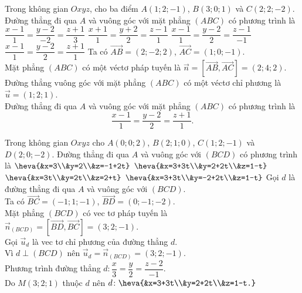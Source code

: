 \begin{ex}%
	Trong không gian $Oxyz$, cho ba điểm $A(1;2;-1)$, $B(3;0;1)$ và $C(2;2;-2)$. Đường thẳng đi qua $A$ và vuông góc với mặt phẳng $(ABC)$ có phương trình là
	\choice
	{$\dfrac{x-1}{1}=\dfrac{y-2}{-2}=\dfrac{z+1}{3}$}
	{$\dfrac{x+1}{1}=\dfrac{y+2}{2}=\dfrac{z-1}{1}$}
	{$\dfrac{x-1}{1}=\dfrac{y-2}{2}=\dfrac{z-1}{-1}$}
	{\True $\dfrac{x-1}{1}=\dfrac{y-2}{2}=\dfrac{z+1}{1}$}
	\loigiai
	{Ta có $\overrightarrow{AB}=(2;-2;2)$, $\overrightarrow{AC}=(1;0;-1)$.\\
		Mặt phẳng $(ABC)$ có một véctơ pháp tuyến là $\vec{n}=\left[\overrightarrow{AB},\overrightarrow{AC}\right]=(2;4;2)$.\\
		Đường thẳng vuông góc với mặt phẳng $(ABC)$ có một véctơ chỉ phương là $\vec{u}=(1;2;1)$.\\
		Đường thẳng đi qua $A$ và vuông góc với mặt phẳng $(ABC)$ có phương trình là
		\[\dfrac{x-1}{1}=\dfrac{y-2}{2}=\dfrac{z+1}{1}.\]
	}
\end{ex}
\begin{ex}%
	Trong không gian $Oxyz$ cho $A(0;0;2)$, $B(2;1;0)$, $C(1;2;-1)$ và $D(2;0;-2)$. Đường thẳng đi qua $A$ và vuông góc với $(BCD)$ có phương trình là
	\choice
	{$\heva{&x=3\\&y=2\\&z=-1+2t}$}
	{\True $\heva{&x=3+3t\\&y=2+2t\\&z=1-t}$}
	{$\heva{&x=3t\\&y=2t\\&z=2+t}$}
	{$\heva{&x=3+3t\\&y=-2+2t\\&z=1-t}$}
	\loigiai
	{
		Gọi $d$ là đường thẳng đi qua $A$ và vuông góc với $(BCD)$.\\
		Ta có $\overrightarrow{BC}=(-1;1;-1)$, $\overrightarrow{BD}=(0;-1;-2)$.\\
		Mặt phẳng $(BCD)$ có vec tơ pháp tuyến là $\vec{n}_{(BCD)}=\left[\overrightarrow{BD},\overrightarrow{BC}\right]=(3;2;-1)$.\\
		Gọi $\vec{u}_{d}$ là vec tơ chỉ phương của đường thẳng $d$.\\
		Vì $d\perp(BCD)$ nên $\overrightarrow{u}_{d}=\vec{n}_{(BCD)}=(3;2;-1)$.\\
		Phương trình đường thẳng $d\colon\dfrac{x}{3}=\dfrac{y}{2}=\dfrac{z-2}{-1}$.\\
		Do $M(3;2;1)$ thuộc $d$ nên $d\colon\heva{&x=3+3t\\&y=2+2t\\&z=1-t.}$
	}
\end{ex}
